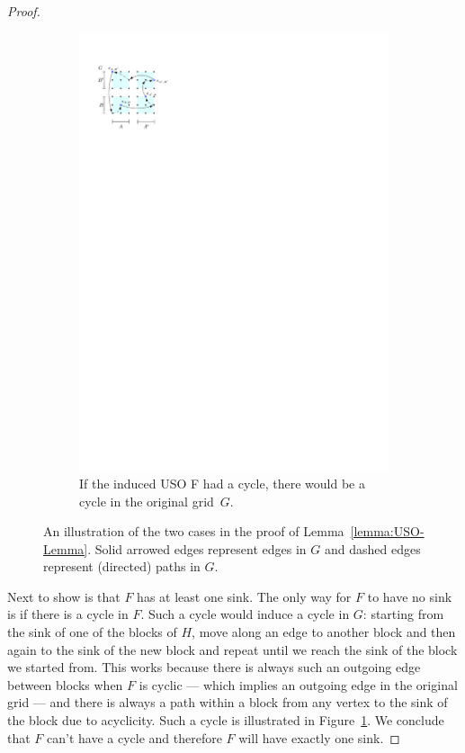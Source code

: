 \documentclass[runningheads,a4paper]{llncs}
\begin{document}
\begin{proof}
\begin{figure}
\begin{subfigure}[t]{0.44\textwidth}
\includegraphics{product_lemma_cycle.pdf}
\caption{\small If the induced USO F had a cycle, there would be a cycle in the original grid~$G$.}
\label{fig:InducedUSOcycle}
\end{subfigure}
\caption{An illustration of the two cases in the proof of Lemma~\ref{lemma:USO-Lemma}. Solid arrowed edges represent edges in $G$ and dashed edges represent (directed) paths in $G$.}
\label{fig:inducesUSOboth}
\end{figure}

Next to show is that $F$ has at least one sink. The only way for $F$ to have no sink is if there is a cycle in $F$. 
Such a cycle would induce a cycle in $G$: starting from the sink of one of the blocks of $H$, move along an edge to 
another block and then again to the sink of the new block and repeat until we reach the sink of the block we started from. 
This works because there is always such an outgoing edge between blocks when $F$ is cyclic --- which implies an outgoing 
edge in the original grid --- and there is always a path within a block from any vertex to the sink of the block due to
acyclicity. Such a cycle is illustrated in Figure~\ref{fig:InducedUSOcycle}. 
 We conclude that $F$ can't have a cycle and therefore $F$ will have exactly one sink.


\end{proof}
\end{document}
